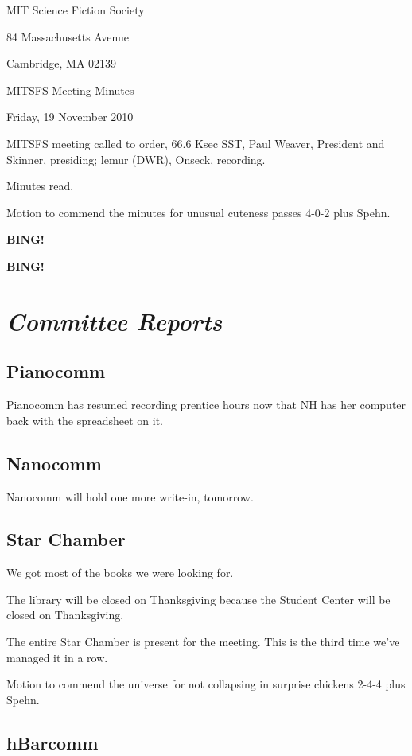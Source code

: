 \documentclass[10pt]{article}
\newcommand{\bing}{{\bf BING!} }
\newcommand{\goto}[1]{\bing \vskip 12pt \section*{{\em{#1}}}}
\newcommand{\ps}{ plus Spehn\xspace}
\newcommand{\skinner}{Paul Weaver, President and Skinner}
\newcommand{\onseck}{lemur (DWR), Onseck}
\newcommand{\meetingdate}{Friday, 19 November 2010}
\begin{document}
\begin{center}

MIT Science Fiction Society

84 Massachusetts Avenue

Cambridge, MA 02139

\vspace{12pt}

MITSFS Meeting Minutes

\meetingdate

\end{center}

\vspace{18pt}

\setlength{\parskip}{6pt}

\noindent
MITSFS meeting called to order, 66.6 Ksec SST,
\skinner, presiding; \onseck, recording.

Minutes read.

Motion to commend the minutes for unusual cuteness passes 4-0-2\ps.

\bing

\goto{Committee Reports}

\subsection*{Pianocomm}

Pianocomm has resumed recording prentice hours now that NH has
her computer back with the spreadsheet on it.

\subsection*{Nanocomm}

Nanocomm will hold one more write-in, tomorrow.

\subsection*{Star Chamber}

We got most of the books we were looking for.

The library will be closed on Thanksgiving because the Student
Center will be closed on Thanksgiving.

The entire Star Chamber is present for the meeting.  This is the third
time we've managed it in a row.

Motion to commend the universe for not collapsing in surprise
chickens 2-4-4\ps.

\subsection*{hBarcomm}
\end{document}

